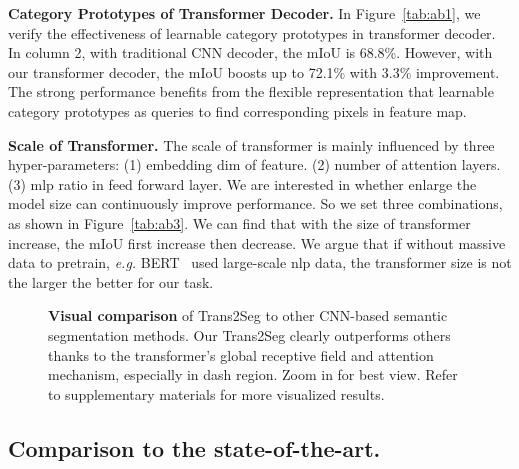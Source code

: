 \documentclass{article}
\begin{document}
\textbf{Category Prototypes of Transformer Decoder.}
In Figure~\ref{tab:ab1}, we verify the effectiveness of learnable category prototypes in transformer decoder.
In column 2, with traditional CNN decoder, the mIoU is 68.8\%. However, with our transformer decoder, the mIoU boosts up to 72.1\% with 3.3\% improvement. The strong performance benefits from the flexible representation that learnable category prototypes as queries to find corresponding pixels in feature map.

\textbf{Scale of Transformer.}
The scale of transformer is mainly influenced by three hyper-parameters: (1) embedding dim of feature. (2) number of attention layers. (3) mlp ratio in feed forward layer. We are interested in whether enlarge the model size can continuously improve performance. So we set three combinations, as shown in Figure~\ref{tab:ab3}. We can find that with the size of transformer increase, the mIoU first increase then decrease. We argue that if without massive data to pretrain, \textit{e.g.} BERT~\cite{bert} used large-scale nlp data, the transformer size is not the larger the better for our task.

\begin{figure}[pt]
    \centering
    \caption{\textbf{Visual comparison} of Trans2Seg to other CNN-based semantic segmentation methods. Our Trans2Seg clearly outperforms others thanks to the transformer's global receptive field and attention mechanism, especially in dash region. Zoom in for best view. Refer to supplementary materials for more visualized results.}
    \label{fig:vis}
\end{figure}

\subsection{Comparison to the state-of-the-art.}
\end{document}
